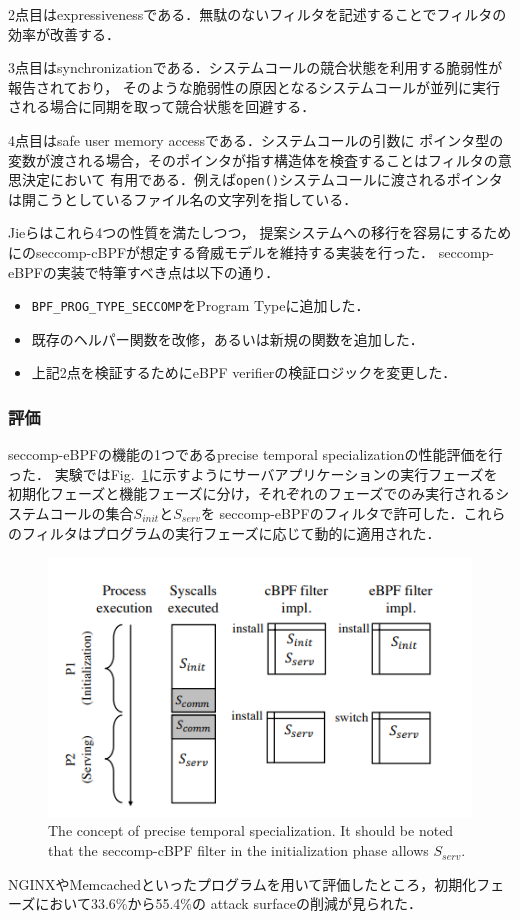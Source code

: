 \documentclass[platex,a4j,10pt,twoside,twocolumn,dvipdfmx]{jsarticle}
\newcommand{\Fref}[1]{Fig.~\ref{#1}}
\begin{document}
2点目はexpressivenessである．無駄のないフィルタを記述することでフィルタの効率が改善する．

3点目はsynchronizationである．システムコールの競合状態を利用する脆弱性が報告されており，
そのような脆弱性の原因となるシステムコールが並列に実行される場合に同期を取って競合状態を回避する．

4点目はsafe user memory accessである．システムコールの引数に
ポインタ型の変数が渡される場合，そのポインタが指す構造体を検査することはフィルタの意思決定において
有用である．例えば\texttt{open()}システムコールに渡されるポインタは開こうとしているファイル名の文字列を指している．

Jieらはこれら4つの性質を満たしつつ，
提案システムへの移行を容易にするためにのseccomp-cBPFが想定する脅威モデルを維持する実装を行った．
seccomp-eBPFの実装で特筆すべき点は以下の通り．
\begin{itemize}
  \item \texttt{BPF\_PROG\_TYPE\_SECCOMP}をProgram Typeに追加した．
  \item 既存のヘルパー関数を改修，あるいは新規の関数を追加した．
  \item 上記2点を検証するためにeBPF verifierの検証ロジックを変更した．
\end{itemize}

\subsubsection{評価}
seccomp-eBPFの機能の1つであるprecise temporal specializationの性能評価を行った．
実験では\Fref{img:tmp-spec}に示すようにサーバアプリケーションの実行フェーズを
初期化フェーズと機能フェーズに分け，それぞれのフェーズでのみ実行されるシステムコールの集合$S_{init}とS_{serv}$を
seccomp-eBPFのフィルタで許可した．これらのフィルタはプログラムの実行フェーズに応じて動的に適用された．
\begin{figure}[tp]
  \begin{center}
    \includegraphics[width=\columnwidth]{./img/tmp-spec.png}
  \end{center}
  \caption{The concept of precise temporal specialization. It should be noted that
    the seccomp-cBPF filter in the initialization phase allows $S_{serv}$.}
  \label{img:tmp-spec}
\end{figure}
NGINXやMemcachedといったプログラムを用いて評価したところ，初期化フェーズにおいて33.6\%から55.4\%の
attack surfaceの削減が見られた．
\end{document}
